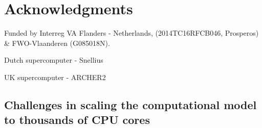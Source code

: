\section{Acknowledgments}

Funded by Interreg VA Flanders - Netherlands, (2014TC16RFCB046, Prosperos) \& FWO-Vlaanderen (G085018N).

Dutch supercomputer - Snellius

UK supercomputer - ARCHER2


\begin{subappendices}

\section{Challenges in scaling the computational model to thousands of CPU cores}



\end{subappendices}


\cleardoublepage

